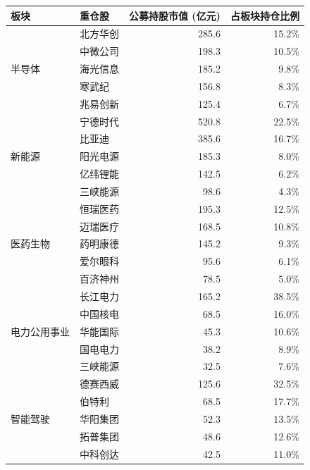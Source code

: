 \begin{exhibitbox}[表 C-2：各板块前五大重仓股及公募持股市值]
\centering
\scriptsize
\renewcommand{\arraystretch}{1.1}
\begin{tabular*}{\textwidth}{@{\extracolsep{\fill}}l l r r@{}}
\toprule
\textbf{板块} & \textbf{重仓股} & \textbf{公募持股市值 (亿元)} & \textbf{占板块持仓比例} \\
\midrule
\multirow{5}{*}{半导体} & 北方华创 & 285.6 & 15.2\% \\
& 中微公司 & 198.3 & 10.5\% \\
& 海光信息 & 185.2 & 9.8\% \\
& 寒武纪 & 156.8 & 8.3\% \\
& 兆易创新 & 125.4 & 6.7\% \\
\cmidrule(lr){2-4}
\multirow{5}{*}{新能源} & 宁德时代 & 520.8 & 22.5\% \\
& 比亚迪 & 385.6 & 16.7\% \\
& 阳光电源 & 185.3 & 8.0\% \\
& 亿纬锂能 & 142.5 & 6.2\% \\
& 三峡能源 & 98.6 & 4.3\% \\
\cmidrule(lr){2-4}
\multirow{5}{*}{医药生物} & 恒瑞医药 & 195.3 & 12.5\% \\
& 迈瑞医疗 & 168.5 & 10.8\% \\
& 药明康德 & 145.2 & 9.3\% \\
& 爱尔眼科 & 95.6 & 6.1\% \\
& 百济神州 & 78.5 & 5.0\% \\
\cmidrule(lr){2-4}
\multirow{5}{*}{电力公用事业} & 长江电力 & 165.2 & 38.5\% \\
& 中国核电 & 68.5 & 16.0\% \\
& 华能国际 & 45.3 & 10.6\% \\
& 国电电力 & 38.2 & 8.9\% \\
& 三峡能源 & 32.5 & 7.6\% \\
\cmidrule(lr){2-4}
\multirow{5}{*}{智能驾驶} & 德赛西威 & 125.6 & 32.5\% \\
& 伯特利 & 68.5 & 17.7\% \\
& 华阳集团 & 52.3 & 13.5\% \\
& 拓普集团 & 48.6 & 12.6\% \\
& 中科创达 & 42.5 & 11.0\% \\
\bottomrule
\end{tabular*}
\vspace{0.5em}
\end{exhibitbox}

